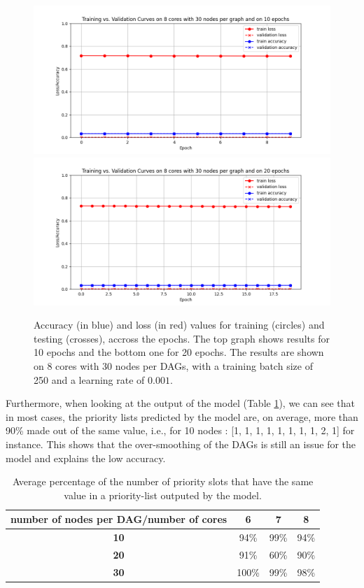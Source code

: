 \begin{figure}
    \centering
    \includegraphics[width=\linewidth]{images/train_val_curves_m8n30epo10.png}
    \includegraphics[width=\linewidth]{images/train_val_curves_m8n30epo20.png}
    \caption{Accuracy (in blue) and loss (in red) values for training (circles) and testing (crosses),
    accross the epochs. The top graph shows results for 10 epochs
    and the bottom one for 20 epochs. The results are shown on 8 cores with 30 nodes per DAGs,
    with a training batch size of 250 and a learning rate of $0.001$.}
    \label{fig:accu_loss_model}
\end{figure}

Furthermore,
when looking at the output of the model (Table \ref{tab:similarity_percentages}),
we can see that in most cases,
the priority lists predicted by the model are, on average, more than 90\% 
made out of the same value, i.e., for 10 nodes : [1, 1, 1, 1, 1, 1, 1, 1, 2, 1] for instance.
This shows that the over-smoothing of the DAGs is still an issue for the model and explains
the low accuracy.

\begin{table}
    \begin{tabular}{|c|c|c|c|}
        \hline
        \textbf{number of nodes per DAG/number of cores} & \textbf{6} & \textbf{7} & \textbf{8}\\
        \hline
        \textbf{10} & 94\% & 99\% & 94\%\\
        \hline
        \textbf{20} & 91\% & 60\% & 90\%\\
        \hline
        \textbf{30} & 100\% & 99\% & 98\%\\
        \hline
    \end{tabular}
    \caption{Average percentage of the number of priority slots that have the same value
    in a priority-list outputed by the model.}
    \label{tab:similarity_percentages}
\end{table}


